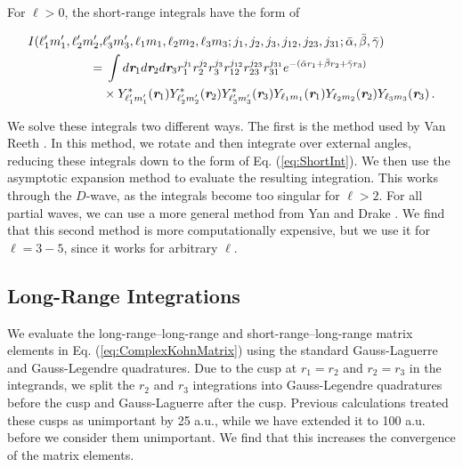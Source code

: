 \documentclass[preprint,showpacs,showkeys,preprintnumbers,amsmath,amssymb,longbibliography,pra,aps]{revtex4-1}
\begin{document}
For $\ell > 0$, the short-range integrals have the form of
\begin{widetext}
\begin{align}
\label{eq:ShortIntGen}
\nonumber I(\ell_1^\prime m_1^\prime, \ell_2^\prime m_2^\prime, &\ell_3^\prime m_3^\prime, \ell_1 m_1, \ell_2 m_2, \ell_3 m_3; j_1,j_2,j_3,j_{12},j_{23},j_{31}; \bar{\alpha}, \bar{\beta}, \bar{\gamma}) \\
= & \; \int d \textit{\textbf{r}}_1 d \textit{\textbf{r}}_2 d \textit{\textbf{r}}_3
r_1^{j_1} r_2^{j_2} r_3^{j_3} r_{12}^{j_{12}}
r_{23}^{j_{23}} r_{31}^{j_{31}}
e^{-(\bar{\alpha} r_1 + \bar{\beta} r_2 + \bar{\gamma} r_3)}  \nonumber \\
& \times Y_{\ell_1^\prime m_1^\prime}^* (\textit{\textbf{r}}_1) Y_{\ell_2^\prime m_2^\prime}^* (\textit{\textbf{r}}_2) Y_{\ell_3^\prime m_3^\prime}^* (\textit{\textbf{r}}_3) Y_{\ell_1 m_1} (\textit{\textbf{r}}_1) Y_{\ell_2 m_2} (\textit{\textbf{r}}_2) Y_{\ell_3 m_3} (\textit{\textbf{r}}_3)\, .
\end{align}
\end{widetext}
We solve these integrals two different ways.
The first is the method used by Van Reeth \cite{VanReethThesis}. In this 
method, we rotate and then integrate over external angles, reducing these 
integrals down to the form of Eq. (\ref{eq:ShortInt}). We then use the 
asymptotic expansion method \cite{Drake1995} to evaluate the resulting
integration. This works through the 
$D$-wave, as the integrals become too singular for $\ell > 2$. For all partial 
waves, we can use a more general method from Yan and Drake \cite{Yan1997}. 
We find that this second method is more computationally expensive, but we use 
it for $\ell = 3 - 5$, since it works for arbitrary $\ell$. 

\subsection{Long-Range Integrations}
\label{sec:LongInt}
We evaluate the long-range--long-range and short-range--long-range matrix 
elements in Eq. (\ref{eq:ComplexKohnMatrix}) using the standard Gauss-Laguerre
and Gauss-Legendre quadratures. Due to the cusp at $r_1 = r_2$ and
$r_2 = r_3$ in the integrands, we split the $r_2$ and $r_3$ integrations into 
Gauss-Legendre quadratures before the cusp and Gauss-Laguerre after the cusp. 
Previous calculations \cite{VanReeth2003,VanReeth2004} treated these cusps as 
unimportant by 25 a.u., while we have extended it to 100 a.u. before we consider 
them unimportant. We find that this increases the convergence of the matrix 
elements.
\end{document}
